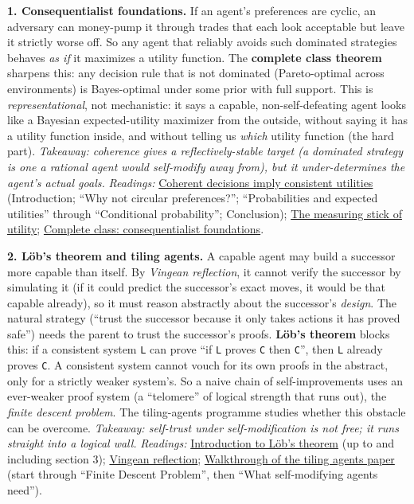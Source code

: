 \documentclass[11pt]{article}
\begin{document}
\textbf{1. Consequentialist foundations.} If an agent's preferences are cyclic, an adversary can money-pump it through trades that each look acceptable but leave it strictly worse off. So any agent that reliably avoids such dominated strategies behaves \emph{as if} it maximizes a utility function. The \textbf{complete class theorem} sharpens this: any decision rule that is not dominated (Pareto-optimal across environments) is Bayes-optimal under some prior with full support. This is \emph{representational}, not mechanistic: it says a capable, non-self-defeating agent looks like a Bayesian expected-utility maximizer from the outside, without saying it has a utility function inside, and without telling us \emph{which} utility function (the hard part). \emph{Takeaway: coherence gives a reflectively-stable target (a dominated strategy is one a rational agent would self-modify away from), but it under-determines the agent's actual goals.} \emph{Readings:} \href{https://www.lesswrong.com/s/SgomvxZ3cJWy2SBCu/p/RQpNHSiWaXTvDxt6R}{Coherent decisions imply consistent utilities} (Introduction; ``Why not circular preferences?''; ``Probabilities and expected utilities'' through ``Conditional probability''; Conclusion); \href{https://www.lesswrong.com/posts/73pTioGZKNcfQmvGF/the-measuring-stick-of-utility-problem}{The measuring stick of utility}; \href{https://www.lesswrong.com/posts/sZuw6SGfmZHvcAAEP/complete-class-consequentialist-foundations}{Complete class: consequentialist foundations}.

\textbf{2. Löb's theorem and tiling agents.} A capable agent may build a successor more capable than itself. By \emph{Vingean reflection}, it cannot verify the successor by simulating it (if it could predict the successor's exact moves, it would be that capable already), so it must reason abstractly about the successor's \emph{design}. The natural strategy (``trust the successor because it only takes actions it has proved safe'') needs the parent to trust the successor's proofs. \textbf{Löb's theorem} blocks this: if a consistent system \texttt{L} can prove ``if \texttt{L} proves \texttt{C} then \texttt{C}'', then \texttt{L} already proves \texttt{C}. A consistent system cannot vouch for its own proofs in the abstract, only for a strictly weaker system's. So a naive chain of self-improvements uses an ever-weaker proof system (a ``telomere'' of logical strength that runs out), the \emph{finite descent problem}. The tiling-agents programme studies whether this obstacle can be overcome. \emph{Takeaway: self-trust under self-modification is not free; it runs straight into a logical wall.} \emph{Readings:} \href{https://intelligence.org/files/lob-notes-IAFF.pdf}{Introduction to Löb's theorem} (up to and including section 3); \href{https://www.lesswrong.com/w/vingean-reflection}{Vingean reflection}; \href{https://www.lesswrong.com/posts/QGrX3qK3qxQYK9D4C/walkthrough-of-the-tiling-agents-for-self-modifying-ai-paper}{Walkthrough of the tiling agents paper} (start through ``Finite Descent Problem'', then ``What self-modifying agents need'').
\end{document}
